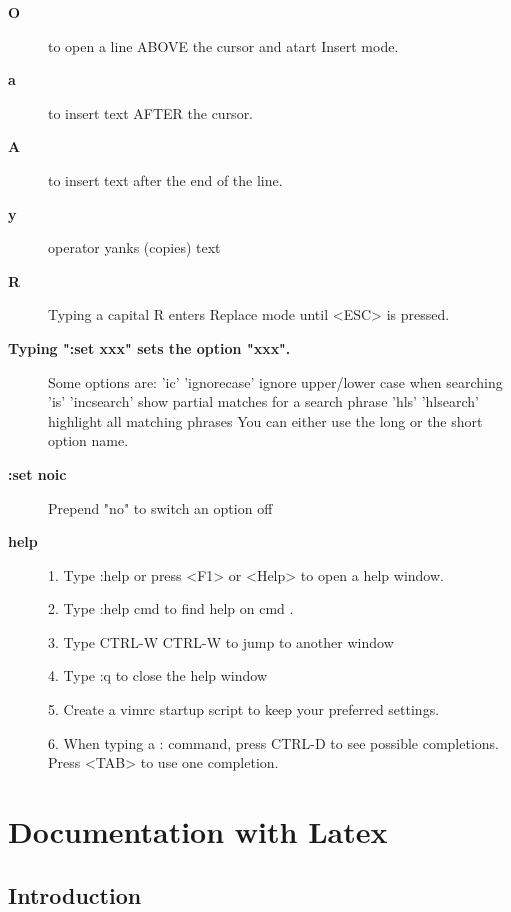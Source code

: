\documentclass[10pt,a4paper]{scrartcl}
\begin{document}
\begin{description}
\item[\bf{O}] to open a line ABOVE the cursor and atart Insert mode.

\item[\bf{a}] to insert text AFTER the cursor.

\item[\bf{A}] to insert text after the end of the line.

\item[\bf{y}] operator yanks (copies) text

\item[\bf{R}] Typing a capital  R  enters Replace mode until  <ESC>  is pressed.

\item[\bf{Typing ":set xxx" sets the option "xxx".}] 
       Some options are:
        'ic' 'ignorecase'       ignore upper/lower case when searching
        'is' 'incsearch'        show partial matches for a search phrase
        'hls' 'hlsearch'        highlight all matching phrases
       You can either use the long or the short option name.

\item[\bf{:set noic}] Prepend "no" to switch an option off

\item[\bf{help}]
  1. Type  :help  or press <F1> or <Help>  to open a help window.

  2. Type  :help cmd  to find help on  cmd .

  3. Type  CTRL-W CTRL-W  to jump to another window

  4. Type  :q  to close the help window

  5. Create a vimrc startup script to keep your preferred settings.

  6. When typing a  :  command, press CTRL-D to see possible completions.
     Press <TAB> to use one completion.




\end{description}

\section{Documentation with Latex}
\subsection{Introduction} 
\end{document}

